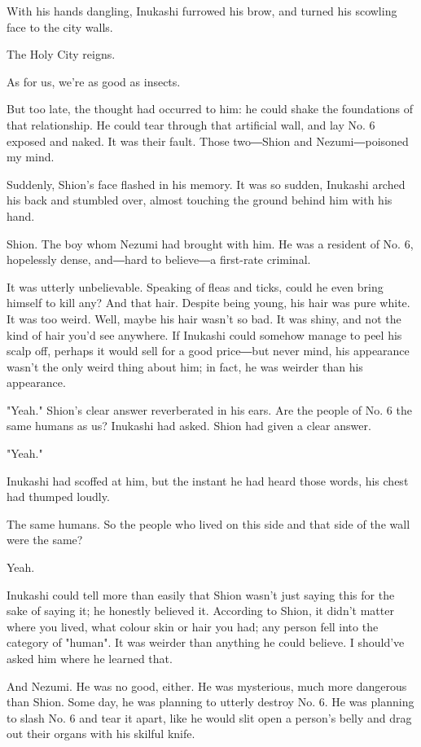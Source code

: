 With his hands dangling, Inukashi furrowed his brow, and turned his
scowling face to the city walls.

The Holy City reigns.

As for us, we're as good as insects.

But too late, the thought had occurred to him: he could shake the
foundations of that relationship. He could tear through that artificial
wall, and lay No. 6 exposed and naked. It was their fault. Those
two―Shion and Nezumi―poisoned my mind.

Suddenly, Shion's face flashed in his memory. It was so sudden, Inukashi
arched his back and stumbled over, almost touching the ground behind him
with his hand.

Shion. The boy whom Nezumi had brought with him. He was a resident of
No. 6, hopelessly dense, and―hard to believe―a first-rate criminal.

It was utterly unbelievable. Speaking of fleas and ticks, could he even
bring himself to kill any? And that hair. Despite being young, his hair
was pure white. It was too weird. Well, maybe his hair wasn't so bad. It
was shiny, and not the kind of hair you'd see anywhere. If Inukashi
could somehow manage to peel his scalp off, perhaps it would sell for a
good price―but never mind, his appearance wasn't the only weird thing
about him; in fact, he was weirder than his appearance.

"Yeah." Shion's clear answer reverberated in his ears. Are the people of
No. 6 the same humans as us? Inukashi had asked. Shion had given a clear
answer.

"Yeah."

Inukashi had scoffed at him, but the instant he had heard those words,
his chest had thumped loudly.

The same humans. So the people who lived on this side and that side of
the wall were the same?

Yeah.

Inukashi could tell more than easily that Shion wasn't just saying this
for the sake of saying it; he honestly believed it. According to Shion,
it didn't matter where you lived, what colour skin or hair you had; any
person fell into the category of "human". It was weirder than anything
he could believe. I should've asked him where he learned that.

And Nezumi. He was no good, either. He was mysterious, much more
dangerous than Shion. Some day, he was planning to utterly destroy No.
6. He was planning to slash No. 6 and tear it apart, like he would slit
open a person's belly and drag out their organs with his skilful knife.


